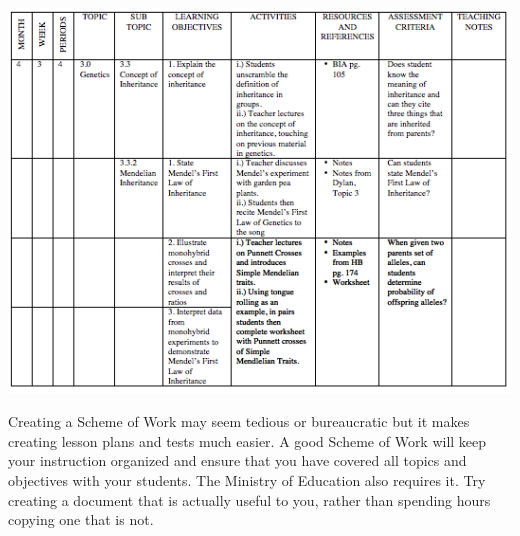 \begin{flushleft}
\includegraphics[scale=.7]{./img/picture-4.png} 
\end{flushleft}

Creating a Scheme of Work may seem tedious or bureaucratic but it makes creating lesson plans and tests much easier.  A good Scheme of Work will keep your instruction organized and ensure that you have covered all topics and objectives with your students.  The Ministry of Education also requires it.   Try creating a document that is actually useful to you, rather than spending hours copying one that is not.
